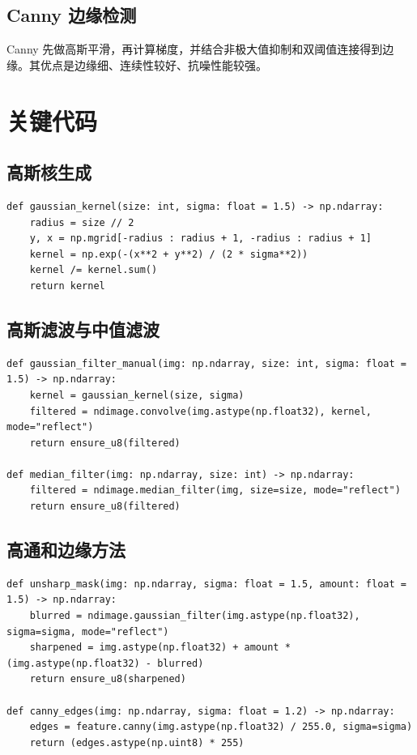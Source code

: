 \documentclass[UTF8,a4paper,12pt]{ctexart}
\begin{document}
\subsection{Canny 边缘检测}
Canny 先做高斯平滑，再计算梯度，并结合非极大值抑制和双阈值连接得到边缘。其优点是边缘细、连续性较好、抗噪性能较强。

\section{关键代码}
\subsection{高斯核生成}
\begin{lstlisting}[style=py]
def gaussian_kernel(size: int, sigma: float = 1.5) -> np.ndarray:
    radius = size // 2
    y, x = np.mgrid[-radius : radius + 1, -radius : radius + 1]
    kernel = np.exp(-(x**2 + y**2) / (2 * sigma**2))
    kernel /= kernel.sum()
    return kernel
\end{lstlisting}

\subsection{高斯滤波与中值滤波}
\begin{lstlisting}[style=py]
def gaussian_filter_manual(img: np.ndarray, size: int, sigma: float = 1.5) -> np.ndarray:
    kernel = gaussian_kernel(size, sigma)
    filtered = ndimage.convolve(img.astype(np.float32), kernel, mode="reflect")
    return ensure_u8(filtered)

def median_filter(img: np.ndarray, size: int) -> np.ndarray:
    filtered = ndimage.median_filter(img, size=size, mode="reflect")
    return ensure_u8(filtered)
\end{lstlisting}

\subsection{高通和边缘方法}
\begin{lstlisting}[style=py]
def unsharp_mask(img: np.ndarray, sigma: float = 1.5, amount: float = 1.5) -> np.ndarray:
    blurred = ndimage.gaussian_filter(img.astype(np.float32), sigma=sigma, mode="reflect")
    sharpened = img.astype(np.float32) + amount * (img.astype(np.float32) - blurred)
    return ensure_u8(sharpened)

def canny_edges(img: np.ndarray, sigma: float = 1.2) -> np.ndarray:
    edges = feature.canny(img.astype(np.float32) / 255.0, sigma=sigma)
    return (edges.astype(np.uint8) * 255)
\end{lstlisting}
\end{document}
